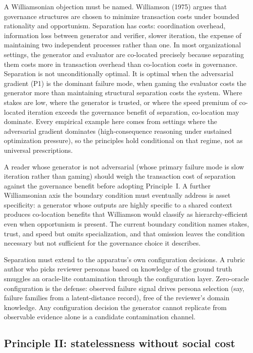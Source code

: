 \documentclass[
  11pt,
]{article}
\begin{document}
A Williamsonian objection must be named. Williamson (1975) argues that
governance structures are chosen to minimize transaction costs under
bounded rationality and opportunism. Separation has costs: coordination
overhead, information loss between generator and verifier, slower
iteration, the expense of maintaining two independent processes rather
than one. In most organizational settings, the generator and evaluator
are co-located precisely because separating them costs more in
transaction overhead than co-location costs in governance. Separation is
not unconditionally optimal. It is optimal when the adversarial gradient
(P1) is the dominant failure mode, when gaming the evaluator costs the
generator more than maintaining structural separation costs the system.
Where stakes are low, where the generator is trusted, or where the speed
premium of co-located iteration exceeds the governance benefit of
separation, co-location may dominate. Every empirical example here comes
from settings where the adversarial gradient dominates (high-consequence
reasoning under sustained optimization pressure), so the principles hold
conditional on that regime, not as universal prescriptions.

A reader whose generator is not adversarial (whose primary failure mode
is slow iteration rather than gaming) should weigh the transaction cost
of separation against the governance benefit before adopting Principle~I.
A further Williamsonian axis the boundary condition must eventually
address is asset specificity: a generator whose outputs are highly
specific to a shared context produces co-location benefits that Williamson
would classify as hierarchy-efficient even when opportunism is present.
The current boundary condition names stakes, trust, and speed but omits
specialization, and that omission leaves the condition necessary but not
sufficient for the governance choice it describes.

Separation must extend to the apparatus's own configuration decisions. A
rubric author who picks reviewer personas based on knowledge of the
ground truth smuggles an oracle-lite contamination through the
configuration layer. Zero-oracle configuration is the defense: observed
failure signal drives persona selection (say, failure families from a
latent-distance record), free of the reviewer's domain knowledge. Any
configuration decision the generator cannot replicate from observable
evidence alone is a candidate contamination channel.

\subsection{Principle II: statelessness without social
cost}\label{principle-ii-statelessness-without-social-cost}
\end{document}
